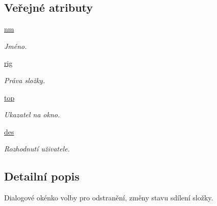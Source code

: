 \subsection*{Veřejné atributy}
\begin{DoxyCompactItemize}
\item 
\hypertarget{classShDiag_1_1ShDiag_a7e3671bb043d174338d5ce9e9c925469}{\hyperlink{classShDiag_1_1ShDiag_a7e3671bb043d174338d5ce9e9c925469}{nm}}\label{db/d2a/classShDiag_1_1ShDiag_a7e3671bb043d174338d5ce9e9c925469}

\begin{DoxyCompactList}\small\item\em Jméno. \end{DoxyCompactList}\item 
\hypertarget{classShDiag_1_1ShDiag_a70201d441b2456467d01fb97f81301b1}{\hyperlink{classShDiag_1_1ShDiag_a70201d441b2456467d01fb97f81301b1}{rig}}\label{db/d2a/classShDiag_1_1ShDiag_a70201d441b2456467d01fb97f81301b1}

\begin{DoxyCompactList}\small\item\em Práva složky. \end{DoxyCompactList}\item 
\hypertarget{classShDiag_1_1ShDiag_a936d32f40683f9972f120482574572d9}{\hyperlink{classShDiag_1_1ShDiag_a936d32f40683f9972f120482574572d9}{top}}\label{db/d2a/classShDiag_1_1ShDiag_a936d32f40683f9972f120482574572d9}

\begin{DoxyCompactList}\small\item\em Ukazatel na okno. \end{DoxyCompactList}\item 
\hypertarget{classShDiag_1_1ShDiag_a5a0159eeffca2b2684bc85dc9f020ba3}{\hyperlink{classShDiag_1_1ShDiag_a5a0159eeffca2b2684bc85dc9f020ba3}{des}}\label{db/d2a/classShDiag_1_1ShDiag_a5a0159eeffca2b2684bc85dc9f020ba3}

\begin{DoxyCompactList}\small\item\em Rozhodnutí uživatele. \end{DoxyCompactList}\end{DoxyCompactItemize}


\subsection{Detailní popis}
Dialogové okénko volby pro odstranění, změny stavu sdílení složky. 

